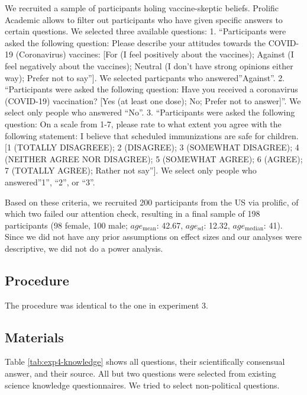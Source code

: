 \documentclass[
  doc,floatsintext]{apa6}
\begin{document}
We recruited a sample of participants holing vaccine-skeptic beliefs. Prolific Academic allows to filter out participants who have given specific answers to certain questions. We selected three available questions: 1. ``Participants were asked the following question: Please describe your attitudes towards the COVID-19 (Coronavirus) vaccines: {[}For (I feel positively about the vaccines); Against (I feel negatively about the vaccines); Neutral (I don't have strong opinions either way); Prefer not to say''{]}. We selected particpants who answered''Against''. 2. ``Participants were asked the following question: Have you received a coronavirus (COVID-19) vaccination? {[}Yes (at least one dose); No; Prefer not to answer{]}''. We select only people who answered ``No''. 3. ``Participants were asked the following question: On a scale from 1-7, please rate to what extent you agree with the following statement: I believe that scheduled immunizations are safe for children. {[}1 (TOTALLY DISAGREEE); 2 (DISAGREE); 3 (SOMEWHAT DISAGREE); 4 (NEITHER AGREE NOR DISAGREE); 5 (SOMEWHAT AGREE); 6 (AGREE); 7 (TOTALLY AGREE); Rather not say''{]}. We select only people who answered''1'', ``2'', or ``3''.

Based on these criteria, we recruited 200 participants from the US via prolific, of which two failed our attention check, resulting in a final sample of 198 participants (98 female, 100 male; \(age_\text{mean}\): 42.67, \(age_\text{sd}\): 12.32, \(age_\text{median}\): 41). Since we did not have any prior assumptions on effect sizes and our analyses were descriptive, we did not do a power analysis.

\subsection{Procedure}\label{procedure-3}

The procedure was identical to the one in experiment 3.

\subsection{Materials}\label{materials-5}

\FloatBarrier

Table \ref{tab:exp4-knowledge} shows all questions, their scientifically consensual answer, and their source. All but two questions were selected from existing science knowledge questionnaires. We tried to select non-political questions.
\end{document}
